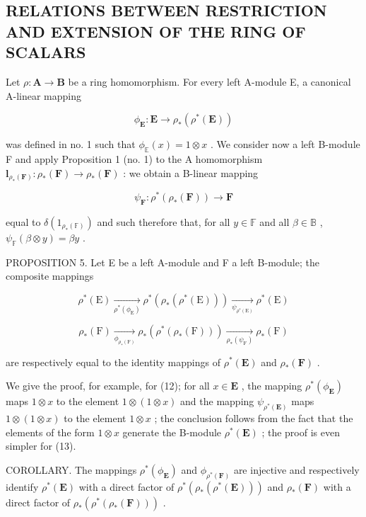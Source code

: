 \subsection{RELATIONS BETWEEN RESTRICTION AND EXTENSION OF THE RING OF SCALARS}

Let \(\rho: \mathbf{A} \to \mathbf{B}\) be a ring homomorphism. For every left A-module E, a canonical A-linear mapping

\[
\phi_ {\mathbf {E}}: \mathbf {E} \rightarrow \rho_ {*} (\rho^ {*} (\mathbf {E}))\tag{10}
\]

was defined in no. 1 such that \(\phi_{\mathbb{E}}(x) = 1 \otimes x\) . We consider now a left B-module F and apply Proposition 1 (no. 1) to the A homomorphism \(\mathbf{l}_{\rho_{*}(\mathbf{F})}: \rho_{*}(\mathbf{F}) \to \rho_{*}(\mathbf{F})\) : we obtain a B-linear mapping

\[
\psi_ {\mathbf {F}} \colon \rho^ {*} (\rho_ {*} (\mathbf {F})) \rightarrow \mathbf {F}\tag{11}
\]

equal to \(\delta(1_{\rho_*(\mathbb{F})})\) and such therefore that, for all \(y \in \mathbb{F}\) and all \(\beta \in \mathbb{B}\) , \(\psi_{\mathbb{F}}(\beta \otimes y) = \beta y\) .

PROPOSITION 5. Let E be a left A-module and F a left B-module; the composite mappings

\[
\rho^ {*} (\mathrm{E}) \xrightarrow [ \rho^ {*} (\phi_ {\mathrm{E}}) ]{} \rho^ {*} (\rho_ {*} (\rho^ {*} (\mathrm{E}))) \xrightarrow [ \psi_ {\rho^ {*} (\mathrm{E})} ]{} \rho^ {*} (\mathrm{E})\tag{12}
\]

\[
\rho_ {*} (\mathrm{F}) \xrightarrow [ \phi_ {\rho_ {*} (\mathrm{F})} ]{} \rho_ {*} (\rho^ {*} (\rho_ {*} (\mathrm{F}))) \xrightarrow [ \rho_ {*} (\psi_ {\mathrm{F}}) ]{} \rho_ {*} (\mathrm{F})\tag{13}
\]

are respectively equal to the identity mappings of \(\rho^{*}(\mathbf{E})\) and \(\rho_{*}(\mathbf{F})\) .

We give the proof, for example, for (12); for all \(x \in \mathbf{E}\) , the mapping \(\rho^{*}(\phi_{\mathbf{E}})\) maps \(1 \otimes x\) to the element \(1 \otimes (1 \otimes x)\) and the mapping \(\psi_{\rho^{*}(\mathbf{E})}\) maps \(1 \otimes (1 \otimes x)\) to the element \(1 \otimes x\) ; the conclusion follows from the fact that the elements of the form \(1 \otimes x\) generate the B-module \(\rho^{*}(\mathbf{E})\) ; the proof is even simpler for (13).

COROLLARY. The mappings \(\rho^{*}(\phi_{\mathbf{E}})\) and \(\phi_{\rho^{*}(\mathbf{F})}\) are injective and respectively identify \(\rho^{*}(\mathbf{E})\) with a direct factor of \(\rho^{*}(\rho_{*}(\rho^{*}(\mathbf{E})))\) and \(\rho_{*}(\mathbf{F})\) with a direct factor of \(\rho_{*}(\rho^{*}(\rho_{*}(\mathbf{F})))\) .

